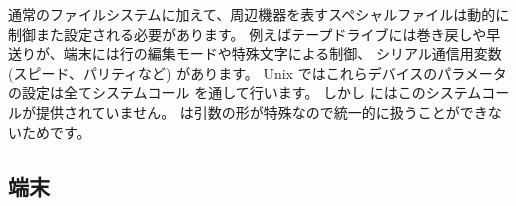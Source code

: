通常のファイルシステムに加えて、周辺機器を表すスペシャルファイルは動的に
制御また設定される必要があります。
例えばテープドライブには巻き戻しや早送りが、端末には行の編集モードや特殊文字による制御、
シリアル通信用変数 (スピード、パリティなど) があります。
Unix ではこれらデバイスのパラメータの設定は全てシステムコール  を通して行います。
しかし \ocaml にはこのシステムコールが提供されていません。
 は引数の形が特殊なので統一的に扱うことができないためです。

\subsection*{\label{sec/termio}端末}

